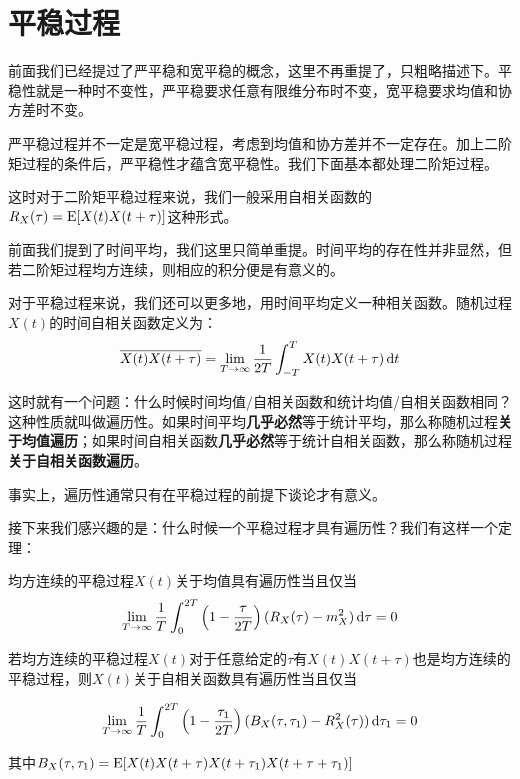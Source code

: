 \section{平稳过程}
前面我们已经提过了严平稳和宽平稳的概念，这里不再重提了，只粗略描述下。平稳性就是一种时不变性，严平稳要求任意有限维分布时不变，宽平稳要求均值和协方差时不变。

\begin{attention}
严平稳过程并不一定是宽平稳过程，考虑到均值和协方差并不一定存在。加上二阶矩过程的条件后，严平稳性才蕴含宽平稳性。我们下面基本都处理二阶矩过程。
\end{attention}

这时对于二阶矩平稳过程来说，我们一般采用自相关函数的\(R_X(\tau)=\operatorname{E}[X(t)X(t+\tau)]\)这种形式。

前面我们提到了时间平均，我们这里只简单重提。时间平均的存在性并非显然，但若二阶矩过程均方连续，则相应的积分便是有意义的。

对于平稳过程来说，我们还可以更多地，用时间平均定义一种相关函数。随机过程\(X(t)\)的时间自相关函数定义为：
\[
\overline{X(t)X(t+\tau)} = \lim_{T\to\infty}\frac{1}{2T}\int^{T}_{-T}X(t)X(t+\tau)\mathop{}\!\mathrm{d} t
\]

这时就有一个问题：什么时候时间均值/自相关函数和统计均值/自相关函数相同？这种性质就叫做遍历性。如果时间平均\textbf{几乎必然}等于统计平均，那么称随机过程\textbf{关于均值遍历}；如果时间自相关函数\textbf{几乎必然}等于统计自相关函数，那么称随机过程\textbf{关于自相关函数遍历}。

\begin{attention}
事实上，遍历性通常只有在平稳过程的前提下谈论才有意义。
\end{attention}

接下来我们感兴趣的是：什么时候一个平稳过程才具有遍历性？我们有这样一个定理：

\begin{theorem}
均方连续的平稳过程\(X(t)\)关于均值具有遍历性当且仅当
\[
\lim_{T\to \infty}\frac{1}{T}\int_{0}^{2T}\left(1-\frac{\tau}{2T}\right)(R_{X}(\tau) -m_X^2)\mathop{}\!\mathrm{d} \tau = 0
\]

若均方连续的平稳过程\(X(t)\)对于任意给定的\(\tau\)有\(X(t)X(t+\tau)\)也是均方连续的平稳过程，则\(X(t)\)关于自相关函数具有遍历性当且仅当

\[
\lim_{T\to \infty}\frac{1}{T}\int_{0}^{2T}\left(1-\frac{\tau_1}{2T}\right)(B_{X}(\tau, \tau_1) -R_X^2(\tau))\mathop{}\!\mathrm{d} \tau_1 = 0
\]

其中\(B_X(\tau, \tau_1) = \operatorname{E}[X(t)X(t+\tau)X(t+\tau_1)X(t+\tau+\tau_1)]\)
\end{theorem}

